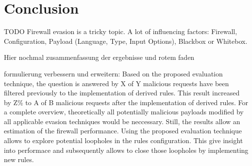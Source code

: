 \section{Conclusion}
\label{sec:conclusion}
{\color{red}TODO
Firewall evasion is a tricky topic. A lot of influencing factors: Firewall, Configuration, Payload (Language, Type, Input Options), Blackbox or Whitebox. 

Hier nochmal zusammenfassung der ergebnisse und rotem faden
}


{\color{blue} formulierung verbessern und erweitern: }
Based on the proposed evaluation technique, the question is answered by X of Y malicious requests have been filtered previously to the implementation of derived rules. This result increased by Z\% to A of B malicious requests after the implementation of derived rules. For a complete overview, theoretically all potentially malicious payloads modified by all applicable evasion techniques would be neccessary. Still, the results allow an estimation of the firewall performance. Using the proposed evaluation technique allows to explore potential loopholes in the rules configuration. This give insight into performace and subsequently allows to close those loopholes by implementing new rules.


